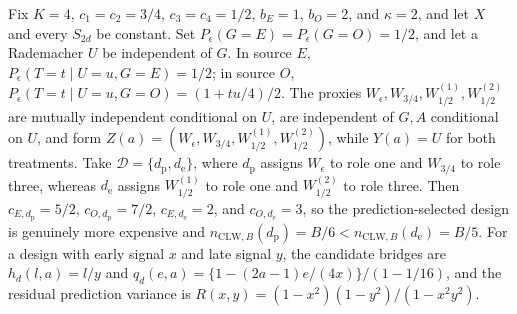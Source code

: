 Fix \(K=4\), \(c_1=c_2=3/4\), \(c_3=c_4=1/2\), \(b_E=1\), \(b_O=2\), and \(\kappa=2\), and let \(X\) and every \(S_{2d}\) be constant. Set \(P_{\epsilon}(G=E)=P_{\epsilon}(G=O)=1/2\), and let a Rademacher \(U\) be independent of \(G\). In source \(E\), \(P_{\epsilon}(T=t\mid U=u,G=E)=1/2\); in source \(O\), \(P_{\epsilon}(T=t\mid U=u,G=O)=(1+tu/4)/2\). The proxies \(W_{\epsilon},W_{3/4},W_{1/2}^{(1)},W_{1/2}^{(2)}\) are mutually independent conditional on \(U\), are independent of \(G,A\) conditional on \(U\), and form \(Z(a)=(W_{\epsilon},W_{3/4},W_{1/2}^{(1)},W_{1/2}^{(2)})\), while \(Y(a)=U\) for both treatments. Take \(\mathcal D=\{d_{\mathrm p},d_{\mathrm e}\}\), where \(d_{\mathrm p}\) assigns \(W_{\epsilon}\) to role one and \(W_{3/4}\) to role three, whereas \(d_{\mathrm e}\) assigns \(W_{1/2}^{(1)}\) to role one and \(W_{1/2}^{(2)}\) to role three. Then \(c_{E,d_{\mathrm p}}=5/2\), \(c_{O,d_{\mathrm p}}=7/2\), \(c_{E,d_{\mathrm e}}=2\), and \(c_{O,d_{\mathrm e}}=3\), so the prediction-selected design is genuinely more expensive and \(n_{\mathrm{CLW},B}(d_{\mathrm p})=B/6<n_{\mathrm{CLW},B}(d_{\mathrm e})=B/5\). For a design with early signal \(x\) and late signal \(y\), the candidate bridges are \(h_d(l,a)=l/y\) and \(q_d(e,a)=\{1-(2a-1)e/(4x)\}/(1-1/16)\), and the residual prediction variance is \(R(x,y)=(1-x^2)(1-y^2)/(1-x^2y^2)\).